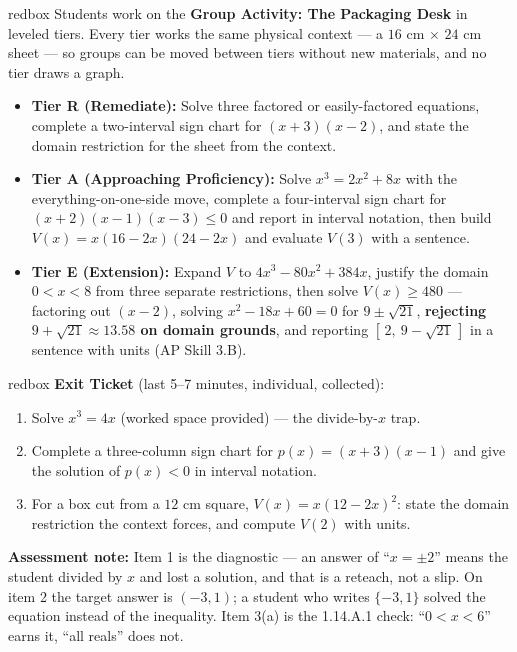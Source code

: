 \documentclass[10pt]{article}
\begin{document}
\begin{skillbox}{redbox}
Students work on the \textbf{Group Activity: The Packaging Desk} in leveled
tiers. Every tier works the same physical context --- a $16$ cm $\times$ $24$
cm sheet --- so groups can be moved between tiers without new materials, and
no tier draws a graph.

\begin{itemize}
  \item \textbf{Tier R (Remediate):} Solve three factored or
        easily-factored equations, complete a two-interval sign chart for
        $(x+3)(x-2)$, and state the domain restriction for the sheet from the
        context.
  \item \textbf{Tier A (Approaching Proficiency):} Solve $x^3 = 2x^2 + 8x$
        with the everything-on-one-side move, complete a four-interval sign
        chart for $(x+2)(x-1)(x-3) \le 0$ and report in interval notation, then
        build $V(x) = x(16-2x)(24-2x)$ and evaluate $V(3)$ with a sentence.
  \item \textbf{Tier E (Extension):} Expand $V$ to $4x^3 - 80x^2 + 384x$,
        justify the domain $0 < x < 8$ from three separate restrictions, then
        solve $V(x) \ge 480$ --- factoring out $(x-2)$, solving
        $x^2 - 18x + 60 = 0$ for $9 \pm \sqrt{21}$, \textbf{rejecting
        $9 + \sqrt{21} \approx 13.58$ on domain grounds}, and reporting
        $[\,2,\ 9-\sqrt{21}\,]$ in a sentence with units (AP Skill 3.B).
\end{itemize}
\end{skillbox}

\begin{skillbox}{redbox}
\textbf{Exit Ticket} (last 5--7 minutes, individual, collected):
\begin{enumerate}
  \item Solve $x^3 = 4x$ (worked space provided) --- the divide-by-$x$ trap.
  \item Complete a three-column sign chart for $p(x) = (x+3)(x-1)$ and give
        the solution of $p(x) < 0$ in interval notation.
  \item For a box cut from a $12$ cm square, $V(x) = x(12-2x)^2$: state the
        domain restriction the context forces, and compute $V(2)$ with units.
\end{enumerate}
\textbf{Assessment note:} Item 1 is the diagnostic --- an answer of
``$x = \pm 2$'' means the student divided by $x$ and lost a solution, and that
is a reteach, not a slip. On item 2 the target answer is $(-3,1)$; a student
who writes $\{-3, 1\}$ solved the equation instead of the inequality. Item 3(a)
is the 1.14.A.1 check: ``$0 < x < 6$'' earns it, ``all reals'' does not.
\end{skillbox}
\end{document}
